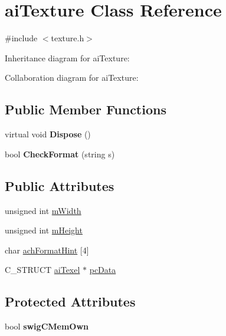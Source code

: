 \hypertarget{structai_texture}{\section{ai\+Texture Class Reference}
\label{structai_texture}
}


{\ttfamily \#include $<$texture.\+h$>$}



Inheritance diagram for ai\+Texture\+:


Collaboration diagram for ai\+Texture\+:
\subsection*{Public Member Functions}
\begin{DoxyCompactItemize}
\item 
\hypertarget{structai_texture_a3554eb216bf6c4e4ba1f5a2ceb0d31e0}{virtual void {\bfseries Dispose} ()}\label{structai_texture_a3554eb216bf6c4e4ba1f5a2ceb0d31e0}

\item 
\hypertarget{structai_texture_a7064fa78e6e73743c1e8753e64da9412}{bool {\bfseries Check\+Format} (string s)}\label{structai_texture_a7064fa78e6e73743c1e8753e64da9412}

\end{DoxyCompactItemize}
\subsection*{Public Attributes}
\begin{DoxyCompactItemize}
\item 
unsigned int \hyperlink{structai_texture_aaa3ad8cfe44fdc4dea2db91977d92234}{m\+Width}
\item 
unsigned int \hyperlink{structai_texture_ac1e2fa6f1f646e9c55e3985d4418a752}{m\+Height}
\item 
char \hyperlink{structai_texture_aa9f44996acf3b301bfeb4e5348311540}{ach\+Format\+Hint} \mbox{[}4\mbox{]}
\item 
C\+\_\+\+S\+T\+R\+U\+C\+T \hyperlink{structai_texel}{ai\+Texel} $\ast$ \hyperlink{structai_texture_aeb07528748b6e49d2d81c60006024f9a}{pc\+Data}
\end{DoxyCompactItemize}
\subsection*{Protected Attributes}
\begin{DoxyCompactItemize}
\item 
\hypertarget{structai_texture_a9905aacbc91ec47659a091b0918349a9}{bool {\bfseries swig\+C\+Mem\+Own}}\label{structai_texture_a9905aacbc91ec47659a091b0918349a9}

\end{DoxyCompactItemize}
